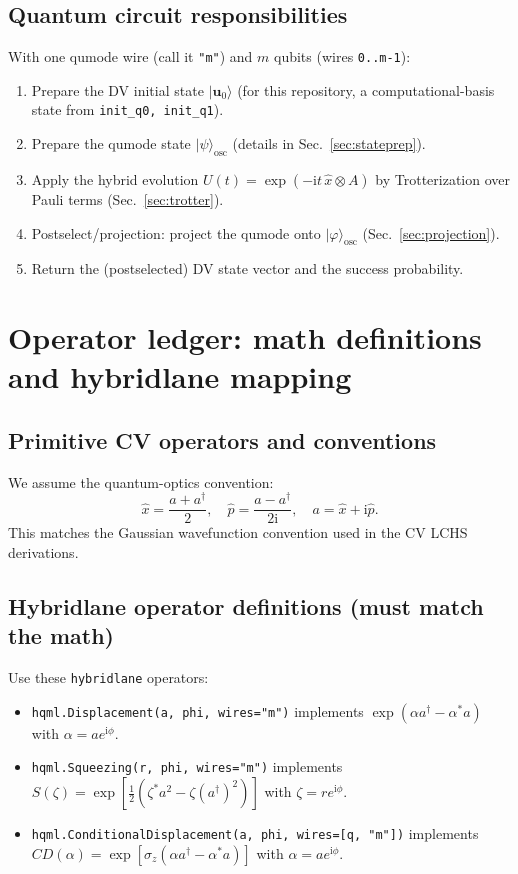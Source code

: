 \documentclass[11pt]{article}
\newcommand{\ii}{\mathrm{i}}
\begin{document}
\subsection{Quantum circuit responsibilities}
With one qumode wire (call it \texttt{"m"}) and $m$ qubits (wires \texttt{0..m-1}):
\begin{enumerate}[itemsep=3pt,topsep=3pt]
\item Prepare the DV initial state $|\mathbf u_0\rangle$ (for this repository, a computational-basis state from \texttt{init\_q0, init\_q1}).
\item Prepare the qumode state $|\psi\rangle_{\mathrm{osc}}$ (details in Sec.~\ref{sec:stateprep}).
\item Apply the hybrid evolution $U(t)=\exp(-\ii t\,\hat{x}\otimes A)$ by Trotterization over Pauli terms (Sec.~\ref{sec:trotter}).
\item Postselect/projection: project the qumode onto $|\varphi\rangle_{\mathrm{osc}}$ (Sec.~\ref{sec:projection}).
\item Return the (postselected) DV state vector and the success probability.
\end{enumerate}

\section{Operator ledger: math definitions and hybridlane mapping}

\subsection{Primitive CV operators and conventions}
We assume the quantum-optics convention:
\[
\hat{x}=\frac{a+a^\dagger}{2},\quad \hat{p}=\frac{a-a^\dagger}{2\ii},\quad a=\hat{x}+\ii\hat{p}.
\]
This matches the Gaussian wavefunction convention used in the CV LCHS derivations.

\subsection{Hybridlane operator definitions (must match the math)}
Use these \texttt{hybridlane} operators:
\begin{itemize}[itemsep=2pt,topsep=2pt]
\item \texttt{hqml.Displacement(a, phi, wires="m")} implements
$\exp(\alpha a^\dagger-\alpha^* a)$ with $\alpha=ae^{\ii\phi}$.
\item \texttt{hqml.Squeezing(r, phi, wires="m")} implements
$S(\zeta)=\exp\left[\frac12(\zeta^*a^2-\zeta(a^\dagger)^2)\right]$ with $\zeta=re^{\ii\phi}$.
\item \texttt{hqml.ConditionalDisplacement(a, phi, wires=[q,\,"m"])} implements
$CD(\alpha)=\exp\left[\sigma_z(\alpha a^\dagger-\alpha^* a)\right]$ with $\alpha=ae^{\ii\phi}$.
\end{itemize}
\end{document}
